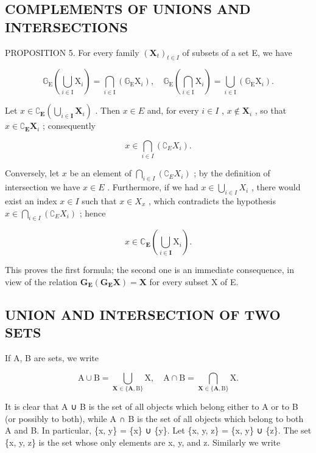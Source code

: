 \subsection{COMPLEMENTS OF UNIONS AND INTERSECTIONS}

PROPOSITION 5. For every family \((\mathbf{X}_t)_{t\in I}\) of subsets of a set E, we have

\[
\mathbb {G} _ {\mathrm{E}} \left(\bigcup_ {i \in \mathrm{I}} \mathrm{X} _ {i}\right) = \bigcap_ {i \in \mathrm{I}} \left(\mathbb {G} _ {\mathrm{E}} \mathrm{X} _ {i}\right), \quad \mathbb {G} _ {\mathrm{E}} \left(\bigcap_ {i \in \mathrm{I}} \mathrm{X} _ {i}\right) = \bigcup_ {i \in \mathrm{I}} \left(\mathbb {G} _ {\mathrm{E}} \mathrm{X} _ {i}\right).
\]

Let \(x \in \complement_{\mathbf{E}} \left( \bigcup_{i \in \mathbf{I}} \mathbf{X}_i \right)\) . Then \(x \in E\) and, for every \(i \in I\) , \(x \notin \mathbf{X}_i\) , so that \(x \in \complement_{\mathbf{E}} \mathbf{X}_i\) ; consequently

\[
x \in \bigcap_ {i \in I} \left(\complement_ {E} X _ {i}\right).
\]

Conversely, let \(x\) be an element of \(\bigcap_{i \in I} (\complement_E X_i)\) ; by the definition of intersection we have \(x \in E\) . Furthermore, if we had \(x \in \bigcup_{i \in I} X_i\) , there would exist an index \(x \in I\) such that \(x \in X_x\) , which contradicts the hypothesis \(x \in \bigcap_{i \in I} (\complement_E X_i)\) ; hence

\[
x \in \mathbb {C} _ {\mathbf {E}} \left(\bigcup_ {i \in \mathbf {I}} \mathrm{X} _ {i}\right).
\]

This proves the first formula; the second one is an immediate consequence, in view of the relation \(\mathbf{G}_{\mathbf{E}}(\mathbf{G}_{\mathbf{E}}\mathbf{X})=\mathbf{X}\) for every subset X of E.

\subsection{UNION AND INTERSECTION OF TWO SETS}

If A, B are sets, we write

\[
\mathrm{A} \cup \mathrm{B} = \bigcup_ {\mathbf {X} \in \{\mathbf {A}, \mathrm{B} \}} \mathrm{X}, \quad \mathrm{A} \cap \mathrm{B} = \bigcap_ {\mathbf {X} \in \{\mathbf {A}, \mathrm{B} \}} \mathrm{X}.
\]

It is clear that A ∪ B is the set of all objects which belong either to A or to B (or possibly to both), while A ∩ B is the set of all objects which belong to both A and B. In particular, \{x, y\} = \{x\} ∪ \{y\}. Let \{x, y, z\} = \{x, y\} ∪ \{z\}. The set \{x, y, z\} is the set whose only elements are x, y, and z. Similarly we write

